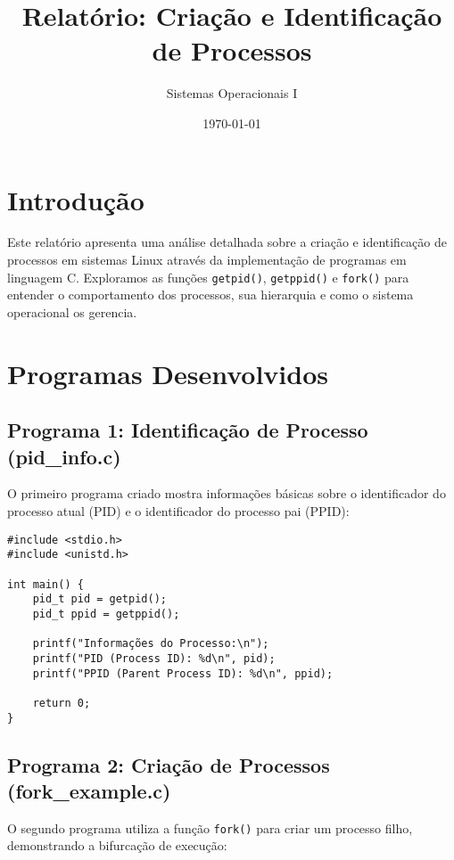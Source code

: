 \documentclass[a4paper,11pt]{article}
\title{\textbf{Relatório: Criação e Identificação de Processos}}
\author{Sistemas Operacionais I}
\date{\today}
\begin{document}
\maketitle
\tableofcontents
\newpage

\section{Introdução}

Este relatório apresenta uma análise detalhada sobre a criação e identificação de processos em sistemas Linux através da implementação de programas em linguagem C. Exploramos as funções \texttt{getpid()}, \texttt{getppid()} e \texttt{fork()} para entender o comportamento dos processos, sua hierarquia e como o sistema operacional os gerencia.

\section{Programas Desenvolvidos}

\subsection{Programa 1: Identificação de Processo (pid\_info.c)}

O primeiro programa criado mostra informações básicas sobre o identificador do processo atual (PID) e o identificador do processo pai (PPID):

\begin{verbatim}
#include <stdio.h>
#include <unistd.h>

int main() {
    pid_t pid = getpid();
    pid_t ppid = getppid();
    
    printf("Informações do Processo:\n");
    printf("PID (Process ID): %d\n", pid);
    printf("PPID (Parent Process ID): %d\n", ppid);
    
    return 0;
}
\end{verbatim}

\subsection{Programa 2: Criação de Processos (fork\_example.c)}

O segundo programa utiliza a função \texttt{fork()} para criar um processo filho, demonstrando a bifurcação de execução:
\end{document}
